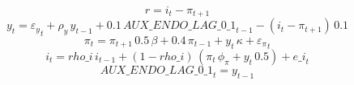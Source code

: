\begin{dmath*}
r = {i}_{t}-{\pi}_{t+1}
\end{dmath*}
\noindent[name= `IS curve']
\begin{dmath}
{y}_{t}={\varepsilon_y}_{t}+{\rho_y}\, {y}_{t-1}+0.1\, {AUX\_ENDO\_LAG\_0\_1}_{t-1}-\left({i}_{t}-{\pi}_{t+1}\right)\, 0.1
\end{dmath}
\noindent[mcp= `pi>0', name= `Phillips curve']
\begin{dmath}
{\pi}_{t}={\pi}_{t+1}\, 0.5\, {\beta}+0.4\, {\pi}_{t-1}+{y}_{t}\, {\kappa}+{\varepsilon_\pi}_{t}
\end{dmath}
\noindent[name= `Taylor rule']
\begin{dmath}
{i}_{t}={rho\_i}\, {i}_{t-1}+\left(1-{rho\_i}\right)\, \left({\pi}_{t}\, {\phi_\pi}+{y}_{t}\, 0.5\right)+{e\_i}_{t}
\end{dmath}
\begin{dmath}
{AUX\_ENDO\_LAG\_0\_1}_{t}={y}_{t-1}
\end{dmath}
